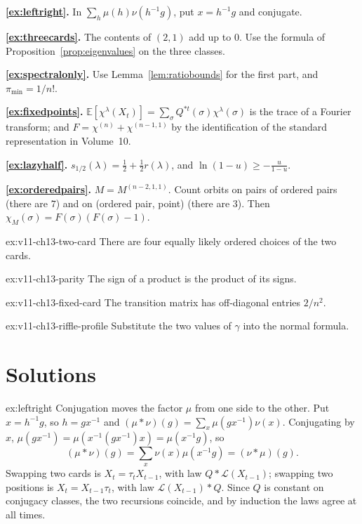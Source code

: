 \noindent\textbf{\ref{ex:leftright}.} In $\sum_h\mu(h)\nu(h^{-1}g)$, put $x=h^{-1}g$ and conjugate.

\noindent\textbf{\ref{ex:threecards}.} The contents of $(2,1)$ add up to $0$. Use the formula of Proposition~\ref{prop:eigenvalues} on the three classes.

\noindent\textbf{\ref{ex:spectralonly}.} Use Lemma~\ref{lem:ratiobounds} for the first part, and $\pi_{\min}=1/n!$.

\noindent\textbf{\ref{ex:fixedpoints}.} $\mathbb E[\chi^\lambda(X_t)]=\sum_\sigma Q^{*t}(\sigma)\chi^\lambda(\sigma)$ is the trace of a Fourier transform; and $F=\chi^{(n)}+\chi^{(n-1,1)}$ by the identification of the standard representation in Volume~10.

\noindent\textbf{\ref{ex:lazyhalf}.} $s_{1/2}(\lambda)=\frac12+\frac12r(\lambda)$, and $\ln(1-u)\ge-\frac u{1-u}$.

\noindent\textbf{\ref{ex:orderedpairs}.} $M=M^{(n-2,1,1)}$. Count orbits on pairs of ordered pairs (there are $7$) and on (ordered pair, point) (there are $3$). Then $\chi_M(\sigma)=F(\sigma)(F(\sigma)-1)$.

\begin{hint}{ex:v11-ch13-two-card}
There are four equally likely ordered choices of the two cards.
\end{hint}

\begin{hint}{ex:v11-ch13-parity}
The sign of a product is the product of its signs.
\end{hint}

\begin{hint}{ex:v11-ch13-fixed-card}
The transition matrix has off-diagonal entries $2/n^2$.
\end{hint}

\begin{hint}{ex:v11-ch13-riffle-profile}
Substitute the two values of $\gamma$ into the normal formula.
\end{hint}

\section{Solutions}

\begin{solution}{ex:leftright}
\idea Conjugation moves the factor $\mu$ from one side to the other.
\writeup Put $x=h^{-1}g$, so $h=gx^{-1}$ and $(\mu*\nu)(g)=\sum_x\mu(gx^{-1})\nu(x)$. Conjugating by $x$, $\mu(gx^{-1})=\mu(x^{-1}(gx^{-1})x)=\mu(x^{-1}g)$, so
\[
(\mu*\nu)(g)=\sum_x\nu(x)\mu(x^{-1}g)=(\nu*\mu)(g).
\] Swapping two cards is $X_{t}=\tau_tX_{t-1}$, with law $Q*\mathcal L(X_{t-1})$;
swapping two positions is $X_t=X_{t-1}\tau_t$, with law $\mathcal L(X_{t-1})*Q$. Since $Q$ is constant on conjugacy classes, the two recursions coincide, and by induction the laws agree at all times.
\end{solution}

